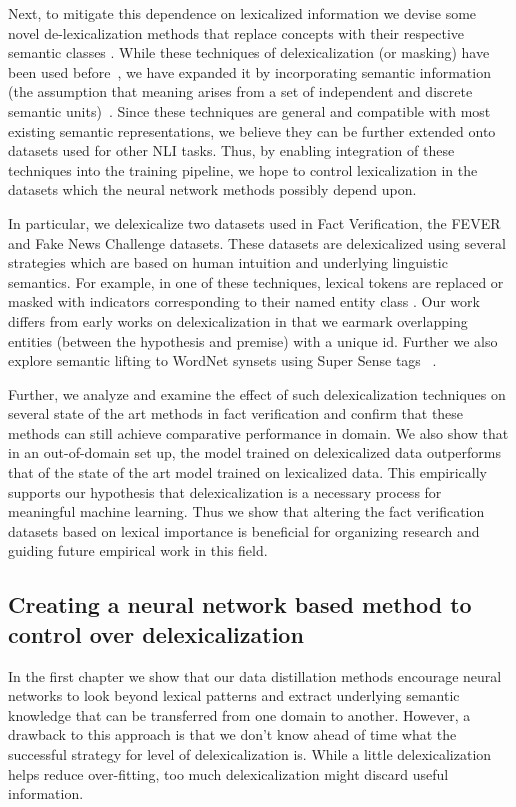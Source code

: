 Next, to mitigate this dependence on lexicalized information we devise some novel de-lexicalization methods
that replace concepts with their respective semantic classes \cite{panenghat2020towards,suntwal-etal-2019-importance}. While these techniques of delexicalization (or masking) have been used before~\citep{zeman2008cross}, we have expanded it by incorporating semantic information (the assumption that meaning arises from a set of independent and discrete semantic units)~\citep{peyrard2019simple}. Since these techniques are general and compatible with most existing semantic representations, we believe they can be further extended onto datasets used for other NLI tasks. Thus, by enabling integration of these techniques into the training pipeline, we hope to control lexicalization in the datasets which the neural network methods possibly depend upon. 


In particular, we  delexicalize two datasets used in Fact Verification, the FEVER and Fake News Challenge datasets. These datasets are delexicalized using several strategies which are based on human intuition and underlying linguistic semantics. For example, in one of these techniques, lexical tokens are replaced or masked with indicators corresponding to their named entity class \citep{grishman1996message}. Our work differs from early works on delexicalization \citep{zeman2008cross} in that we earmark overlapping entities (between the hypothesis and premise) with a unique id. Further we also  explore semantic lifting to WordNet synsets using Super Sense tags ~\citep{ciaramita2003supersense,miller1990introduction}.


Further, we analyze and examine the effect of such delexicalization techniques on several state of the art methods in fact verification and confirm that these methods can still achieve comparative performance in domain. We also show that  in an out-of-domain set up, the model trained on delexicalized data outperforms that of the state of the art model trained on lexicalized data. This empirically supports our hypothesis that delexicalization is a necessary process for meaningful machine learning. Thus we show that altering the fact verification datasets based on lexical importance is beneficial for organizing research and guiding future empirical work in this field.


\subsection{Creating a neural network based method to control over delexicalization}
In the first chapter we show that our data distillation methods encourage neural networks to look beyond lexical patterns and extract underlying semantic knowledge that can be transferred from one domain to another. However, a drawback to this approach is that we don't know ahead of time what the successful strategy for level of delexicalization is. While a little delexicalization helps reduce over-fitting, too much delexicalization might discard useful information.



